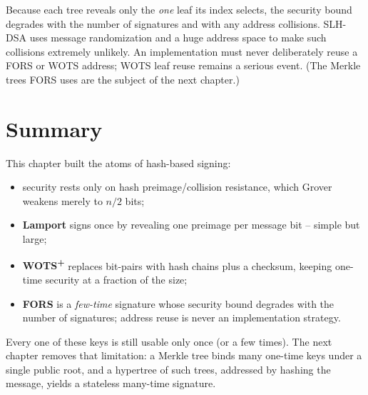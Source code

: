 Because each tree reveals only the \emph{one} leaf its index selects, the security bound degrades with the number of signatures and with any address collisions. SLH-DSA uses message randomization and a huge address space to make such collisions extremely unlikely. An implementation must never deliberately reuse a FORS or WOTS address; WOTS leaf reuse remains a serious event. (The Merkle trees FORS uses are the subject of the next chapter.)

\section{Summary}
This chapter built the atoms of hash-based signing:

\begin{itemize}
  \item security rests only on hash preimage/collision resistance, which Grover weakens merely to $n/2$ bits;
  \item \textbf{Lamport} signs once by revealing one preimage per message bit -- simple but large;
  \item \textbf{WOTS\textsuperscript{+}} replaces bit-pairs with hash chains plus a checksum, keeping one-time security at a fraction of the size;
  \item \textbf{FORS} is a \emph{few-time} signature whose security bound degrades with the number of signatures; address reuse is never an implementation strategy.
\end{itemize}

Every one of these keys is still usable only once (or a few times). The next chapter removes that limitation: a Merkle tree binds many one-time keys under a single public root, and a hypertree of such trees, addressed by hashing the message, yields a stateless many-time signature.

\printbibliography[heading=chapterrefs]
